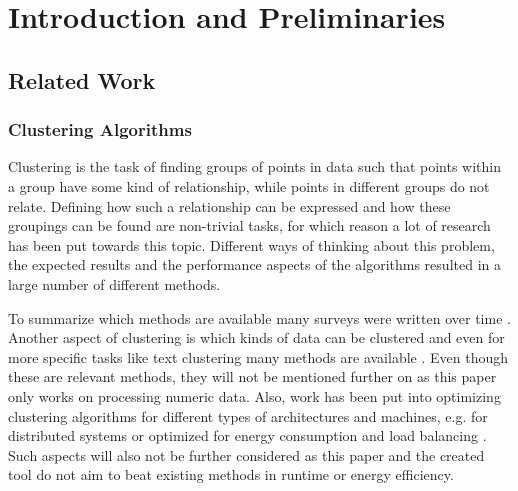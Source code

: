 \documentclass[
	a4paper,
	english,
	twoside,
	openright,               
	11pt                            
	]{report}
\begin{document}




\tableofcontents
 \cleardoublepage
%
%
\listoffigures
\cleardoublepage

\cleardoublepage

\cleardoublepage

 \part{Introduction and Preliminaries}
   \setcounter{page}{1}
 


\chapter{Related Work}\label{cha:related_work}
\section{Clustering Algorithms}

Clustering is the task of finding groups of points in data such that points within a group have some kind of relationship, while points in different groups do not relate. Defining how such a relationship can be expressed and how these groupings can be found are non-trivial tasks, for which reason a lot of research has been put towards this topic. Different ways of thinking about this problem, the expected results and the performance aspects of the algorithms resulted in a large number of different methods. 

 To summarize which methods are available many surveys were written over time \cite{7154919,1427769,7414675,surveyclustering}. Another aspect of clustering is which kinds of data can be clustered and even for more specific tasks like text clustering many methods are available \cite{5982288}. Even though these are relevant methods, they will not be mentioned further on as this paper only works on processing numeric data. Also, work has been put into optimizing clustering algorithms for different types of architectures and machines, e.g. for distributed systems \cite{6322592} or optimized for energy consumption and load balancing \cite{7586361}. Such aspects will also not be further considered as this paper and the created tool do not aim to beat existing methods in runtime or energy efficiency.
\end{document}
